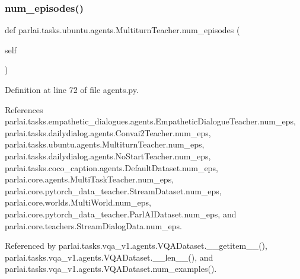 \mbox{\label{classparlai_1_1tasks_1_1ubuntu_1_1agents_1_1MultiturnTeacher_a420b358909e5dd3dcbf2ec4bb3b3080d}} 
\subsubsection{\texorpdfstring{num\+\_\+episodes()}{num\_episodes()}}
{\footnotesize\ttfamily def parlai.\+tasks.\+ubuntu.\+agents.\+Multiturn\+Teacher.\+num\+\_\+episodes (\begin{DoxyParamCaption}\item[{}]{self }\end{DoxyParamCaption})}



Definition at line 72 of file agents.\+py.



References parlai.\+tasks.\+empathetic\+\_\+dialogues.\+agents.\+Empathetic\+Dialogue\+Teacher.\+num\+\_\+eps, parlai.\+tasks.\+dailydialog.\+agents.\+Convai2\+Teacher.\+num\+\_\+eps, parlai.\+tasks.\+ubuntu.\+agents.\+Multiturn\+Teacher.\+num\+\_\+eps, parlai.\+tasks.\+dailydialog.\+agents.\+No\+Start\+Teacher.\+num\+\_\+eps, parlai.\+tasks.\+coco\+\_\+caption.\+agents.\+Default\+Dataset.\+num\+\_\+eps, parlai.\+core.\+agents.\+Multi\+Task\+Teacher.\+num\+\_\+eps, parlai.\+core.\+pytorch\+\_\+data\+\_\+teacher.\+Stream\+Dataset.\+num\+\_\+eps, parlai.\+core.\+worlds.\+Multi\+World.\+num\+\_\+eps, parlai.\+core.\+pytorch\+\_\+data\+\_\+teacher.\+Parl\+A\+I\+Dataset.\+num\+\_\+eps, and parlai.\+core.\+teachers.\+Stream\+Dialog\+Data.\+num\+\_\+eps.



Referenced by parlai.\+tasks.\+vqa\+\_\+v1.\+agents.\+V\+Q\+A\+Dataset.\+\_\+\+\_\+getitem\+\_\+\+\_\+(), parlai.\+tasks.\+vqa\+\_\+v1.\+agents.\+V\+Q\+A\+Dataset.\+\_\+\+\_\+len\+\_\+\+\_\+(), and parlai.\+tasks.\+vqa\+\_\+v1.\+agents.\+V\+Q\+A\+Dataset.\+num\+\_\+examples().

